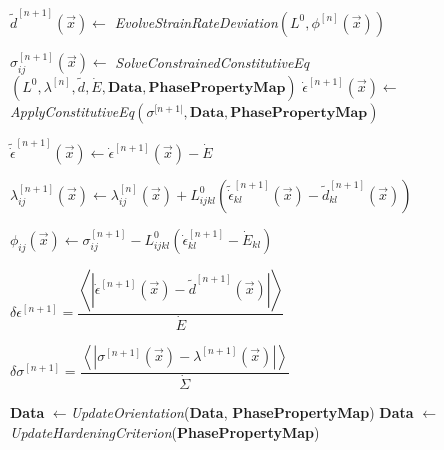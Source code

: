 \documentclass[11pt]{article}
\newcommand\ALIGNEDCOMMENT[1]{\hfill\eqparbox{COMMENT}{\# #1}}
\begin{document}
\begin{algorithm}
\begin{algorithmic}[1]

\REPEAT


\STATE $\tilde{d}^{[n+1]}(\vec{x}) \leftarrow$ \textit{EvolveStrainRateDeviation}$\left( L^0, \phi^{[n]}(\vec{x}) \right)$ 

\STATE $\sigma^{[n+1]}_{ij}(\vec{x}) \leftarrow$ \textit{SolveConstrainedConstitutiveEq}$\left( L^0, \lambda^{[n]}, \tilde{d}, \dot{E}, \mathrm{\textbf{Data}}, \mathrm{\textbf{PhasePropertyMap}}\right)$ 
\STATE $\dot{\epsilon}^{[n+1]}(\vec{x}) \leftarrow$ \textit{ApplyConstitutiveEq}$\left( \sigma^{[n+1|}, \mathrm{\textbf{Data}}, \mathrm{\textbf{PhasePropertyMap}}\right)$

\STATE $ \tilde{\dot{\epsilon}}^{[n+1]}(\vec{x}) \leftarrow  \dot{\epsilon}^{[n+1]}(\vec{x}) - \dot{E}$


\STATE $\lambda_{ij}^{[n+1]}(\vec{x}) \leftarrow \lambda_{ij}^{[n]}( \vec{x}) + L^0_{ijkl} \left(\tilde{\dot{\epsilon}}_{kl}^{[n+1]}(\vec{x})  - \tilde{d}_{kl}^{[n+1]}(\vec{x}) \right) $







\STATE $\phi_{ij}(\vec{x}) \leftarrow \sigma_{ij}^{[n+1]} - L_{ijkl}^0 \left( \dot{\epsilon}^{[n+1]}_{kl} - \dot{E}_{kl} \right)$ 

\STATE $\delta\epsilon^{[n+1]} = \dfrac{\left \langle | \dot{\epsilon}^{[n+1]}( \vec{x}) - \tilde{d}^{[n+1]}(\vec{x})| \right\rangle}
                                                               {\dot{E}} $

\STATE $\delta\sigma^{[n+1]} = \dfrac{\left \langle | \sigma^{[n+1]}( \vec{x}) - \lambda^{[n+1]}(\vec{x})| \right \rangle}
                                                             {\dot{\Sigma}} $


\STATE \textbf{Data} $\leftarrow$\textit{UpdateOrientation}(\textbf{Data}, \textbf{PhasePropertyMap})
\STATE \textbf{Data} $\leftarrow$ \textit{UpdateHardeningCriterion}(\textbf{PhasePropertyMap})
\end{algorithmic}
\end{algorithm}
\end{document}
